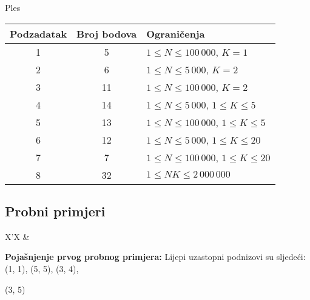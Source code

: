 \begin{statement}[
  problempoints=100,
  timelimit=1 sekunda,
  memorylimit=512 MiB,
]{Ples}
{\renewcommand{\arraystretch}{1.4}
  \setlength{\tabcolsep}{6pt}
  \begin{tabular}{ccl}
   Podzadatak & Broj bodova & Ograničenja \\ \midrule
    1 & 5 & $1 \le N \le 100\,000$, $K = 1$\\
    2 & 6 & $1 \le N \le 5\,000$, $K = 2$ \\
    3 & 11 & $1 \le N \le 100\,000$, $K = 2$ \\
    4 & 14 & $1 \le N \le 5\,000$, $1 \leq K \leq 5$ \\
    5 & 13 & $1 \le N \le 100\,000$, $1 \leq K \leq 5$ \\
    6 & 12 & $1 \le N \le 5\,000$, $1 \leq K \leq 20$ \\
    7 & 7 & $1 \le N \le 100\,000$, $1 \leq K \leq 20$ \\
    8 & 32 & $1 \leq NK \le 2\,000\,000$
\end{tabular}}

\subsection*{Probni primjeri}
\begin{tabularx}{\textwidth}{X'X}
 &
\end{tabularx}

\textbf{Pojašnjenje prvog probnog primjera:}
Lijepi uzastopni podnizovi su sljedeći: (1, 1), (5, 5), (3, 4),

 (3, 5)

\end{statement}

